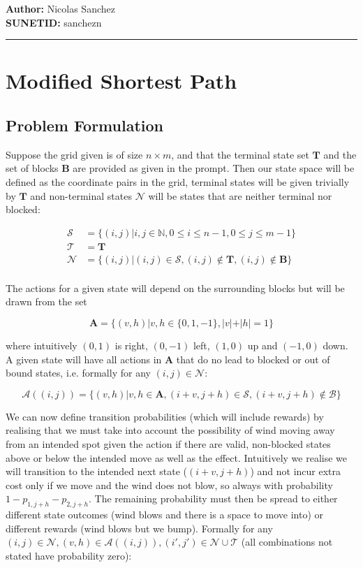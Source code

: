 \documentclass{article}[12pt]
\newcommand{\headings}[4]{\noindent {\bf Final CME241} \hfill {{\bf Author:} Nicolas Sanchez} \\
{} \hfill {{\bf SUNETID:} sanchezn} \\

\rule[0.1in]{\textwidth}{0.025in}
}
\begin{document}
\headings{\#1}{Tuesday, October 8, 10:30am}\section{} 



\section{Modified Shortest Path}
\subsection{Problem Formulation}
Suppose the grid given is of size $n\times m$, and that the terminal state set $\mathbf{T}$ and the set of blocks $\mathbf{B}$ are provided as given in the prompt. Then our state space will be defined as the coordinate pairs in the grid,  terminal states will be given trivially by $\mathbf{T}$ and non-terminal states  $\mathcal{N}$ will be states that are neither terminal nor blocked:

\begin{align*}
\mathcal{S} &= \{ (i,j) | i,j \in \mathbb{N}, 0\leq i \leq n-1, 0\leq j \leq m-1\}\\
\mathcal{T} &=\mathbf{T}\\
\mathcal{N} &= \{ (i,j) | (i,j) \in \mathcal{S}, (i,j)\not\in \mathbf{T}, (i,j) \not\in \mathbf{B}\}\\
\end{align*}

The actions for a given state will depend on the surrounding blocks but will be drawn from the set 

$$\mathbf{A} = \{(v,h) | v,h \in \{0,1,-1\}, |v|+|h| = 1\}$$

where intuitively $(0,1)$ is right, $(0,-1)$ left, $(1,0)$ up and $(-1,0)$ down. A given state will have all actions in $\mathbf{A}$ that do no lead to blocked or out of bound states, i.e. formally for any $(i,j)\in \mathcal{N}$:

$$ \mathcal{A}((i,j)) = \{(v,h) | v,h \in \mathbf{A}, (i+v, j+h) \in \mathcal{S}, (i+v, j+h) \not\in \mathcal{B}\}$$


We can now define transition probabilities (which will include rewards) by realising that we must take into account the possibility of wind moving away from an intended spot given the action if there are valid, non-blocked states above or below the intended move as well as the effect. Intuitively we realise we will transition to the intended next state ($(i+v, j+h)$) and not incur extra cost only if we move and the wind does not blow, so always with probability $1-p_{1,j+h}-p_{2,j+h}$. The remaining probability must then be spread to either different state outcomes (wind blows and there is a space to move into) or different rewards (wind blows but we bump). Formally for any $(i,j)\in\mathcal{N}, (v,h) \in \mathcal{A}((i,j)), (i',j')\in\mathcal{N}\cup\mathcal{T}$ (all combinations not stated have probability zero):
\end{document}
